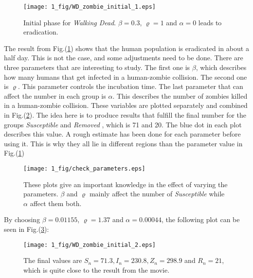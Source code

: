 \documentclass[%
twoside,                 %
final,                   %
chapterprefix=true,      %
open=right               %
10pt]{book}
\begin{document}
\begin{figure}[ht]
  \centerline{\texttt{[image: 1\_fig/WD\_zombie\_initial\_1.eps]}}
  \caption{
  \label{fig:initial_phase_1} Initial phase for \emph{Walking Dead}. $\beta=0.3$, $\varrho=1$ and $\alpha=0$ leads to eradication.
  }
\end{figure}


The result from Fig.(\ref{fig:initial_phase_1}) shows that the human population is eradicated in about a half day. This is not the case, and some adjustments need to be done. There are three parameters that are interesting to study. The first one is $\beta$, which describes how many humans that get infected in a human-zombie collision. The second one is $\varrho$. This parameter controls the incubation time. The last parameter that can affect the number in each group is $\alpha$. This describes the number of zombies killed in a human-zombie collision. These variables are plotted separately and combined in Fig.(\ref{fig:initial_parameters}). The idea here is to produce results that fulfill the final number for the groups \emph{Susceptible} and \emph{Removed} , which is 71 and 20. The blue dot in each plot describes this value. A rough estimate has been done for each parameter before using it. This is why they all lie in different regions than the parameter value in Fig.(\ref{fig:initial_phase_1})



\begin{figure}[ht]
  \centerline{\texttt{[image: 1\_fig/check\_parameters.eps]}}
  \caption{
  \label{fig:initial_parameters} These plots give an important knowledge in the effect of varying the parameters. $\beta$ and $\varrho$ mainly affect the number of \emph{Susceptible} while $\alpha$ affect them both.
  }
\end{figure}


By choosing $\beta = 0.01155$, $\varrho=1.37$ and $\alpha=0.00044$, the following plot can be seen in Fig.(\ref{fig:initial_phase_2}):  


\begin{figure}[ht]
  \centerline{\texttt{[image: 1\_fig/WD\_zombie\_initial\_2.eps]}}
  \caption{
  \label{fig:initial_phase_2} The final values are $S_n=71.3,I_n=230.8,Z_n=298.9$ and $R_n=21$, which is quite close to the result from the movie.
  }
\end{figure}
\end{document}
